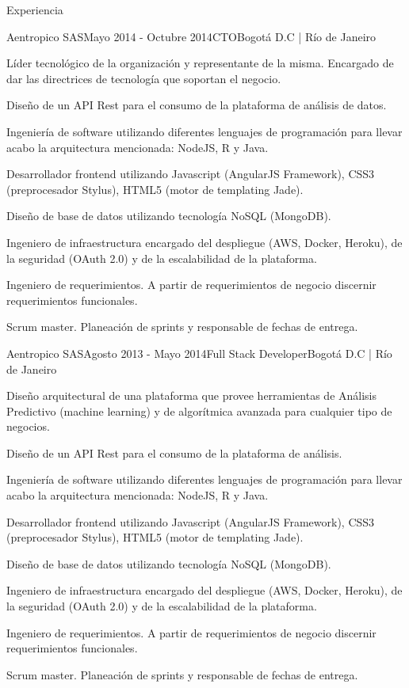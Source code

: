 \documentclass[spanish]{resume} %
\begin{document}
\begin{rSection}{Experiencia}
\begin{rSubsection}{Aentropico SAS}{Mayo 2014 - Octubre 2014}{CTO}{Bogot\'a D.C | R\'io de Janeiro}
\item L\'ider tecnol\'ogico de la organizaci\'on y representante de la misma. Encargado de dar las directrices de tecnolog\'ia que soportan el negocio.
\item Dise\~no de un API Rest para el consumo de la plataforma de an\'alisis de datos.
\item Ingenier\'ia de software utilizando diferentes lenguajes de programaci\'on para llevar acabo la arquitectura mencionada: NodeJS, R y Java.
\item Desarrollador frontend utilizando Javascript (AngularJS Framework), CSS3 (preprocesador Stylus), HTML5 (motor de templating Jade).
\item Dise\~no de base de datos utilizando tecnolog\'ia NoSQL (MongoDB).
\item Ingeniero de infraestructura encargado del despliegue (AWS, Docker, Heroku), de la seguridad (OAuth 2.0) y de la escalabilidad de la plataforma.
\item Ingeniero de requerimientos. A partir de requerimientos de negocio discernir requerimientos funcionales.
\item Scrum master. Planeaci\'on de sprints y responsable de fechas de entrega.
\end{rSubsection}


\begin{rSubsection}{Aentropico SAS}{Agosto 2013 - Mayo 2014}{Full Stack Developer}{Bogot\'a D.C | R\'io de Janeiro}
\item Dise\~no arquitectural de una plataforma que provee herramientas de An\'alisis Predictivo (machine learning) y de algor\'itmica avanzada para cualquier tipo de negocios.
\item Dise\~no de un API Rest para el consumo de la plataforma de an\'alisis.
\item Ingenier\'ia de software utilizando diferentes lenguajes de programaci\'on para llevar acabo la arquitectura mencionada: NodeJS, R y Java.
\item Desarrollador frontend utilizando Javascript (AngularJS Framework), CSS3 (preprocesador Stylus), HTML5 (motor de templating Jade).
\item Dise\~no de base de datos utilizando tecnolog\'ia NoSQL (MongoDB).
\item Ingeniero de infraestructura encargado del despliegue (AWS, Docker, Heroku), de la seguridad (OAuth 2.0) y de la escalabilidad de la plataforma.
\item Ingeniero de requerimientos. A partir de requerimientos de negocio discernir requerimientos funcionales.
\item Scrum master. Planeaci\'on de sprints y responsable de fechas de entrega.
\end{rSubsection}


\end{rSection}
\end{document}
